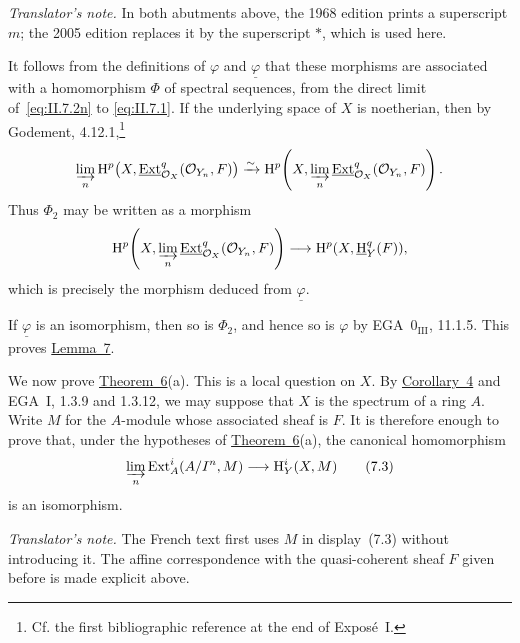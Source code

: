 \noindent\textit{Translator's note.} In both abutments above, the 1968
edition prints a superscript $m$; the 2005 edition replaces it by the
superscript $*$, which is used here.

It follows from the definitions of $\varphi$ and $\underline{\varphi}$ that
these morphisms are associated with a homomorphism $\Phi$ of spectral
sequences, from the direct limit of~\eqref{eq:II.7.2n} to
\eqref{eq:II.7.1}. If the underlying space of $X$ is noetherian, then by
Godement, 4.12.1,\footnote{Cf. the first bibliographic reference at the end
of Expos\'e~I.}
\[
  \varinjlim_n
    \mathrm H^p\bigl(X,\mathop{\underline{\mathrm{Ext}}}\nolimits_{\mathcal O_X}^q(\mathcal O_{Y_n},F)\bigr)
  \xrightarrow{\sim}
  \mathrm H^p\!\left(
    X,\varinjlim_n\mathop{\underline{\mathrm{Ext}}}\nolimits_{\mathcal O_X}^q(\mathcal O_{Y_n},F)\right).
\]
Thus $\Phi_2$ may be written as a morphism
\[
  \mathrm H^p\!\left(
    X,\varinjlim_n\mathop{\underline{\mathrm{Ext}}}\nolimits_{\mathcal O_X}^q(\mathcal O_{Y_n},F)\right)
  \longrightarrow \mathrm H^p(X,\mathop{\underline{\mathrm H}}\nolimits_Y^q(F)),
\]
which is precisely the morphism deduced from $\underline{\varphi}$.

If $\underline{\varphi}$ is an isomorphism, then so is
$\Phi_2$, and hence so is $\varphi$ by EGA~$0_{\mathrm{III}}$, 11.1.5.
This proves \hyperref[II.7]{Lemma~7}.

We now prove \hyperref[II.6]{Theorem~6}(a). This is a local question on $X$. By \hyperref[II.4]{Corollary~4}
and EGA~I, 1.3.9 and 1.3.12, we may suppose that $X$ is the spectrum of a
ring $A$. Write $M$ for the $A$-module whose associated sheaf is $F$. It is
therefore enough to prove that, under the hypotheses of \hyperref[II.6]{Theorem~6}(a), the
canonical homomorphism
\begin{equation}
  \varinjlim_n\operatorname{Ext}_A^i(A/I^n,M)
  \longrightarrow \mathrm H_Y^i(X,M)
  \tag{7.3}\label{eq:II.7.3}
\end{equation}
is an isomorphism.

\noindent\textit{Translator's note.} The French text first uses $M$ in
display~(7.3) without introducing it. The affine correspondence with the
quasi-coherent sheaf $F$ given before is made explicit above.

